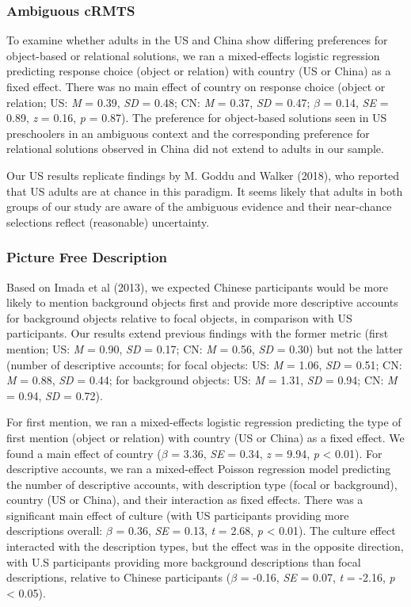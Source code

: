 \documentclass[
  man,floatsintext]{apa6}
\begin{document}
\hypertarget{ambiguous-crmts-1}{%
\subsubsection{Ambiguous cRMTS}\label{ambiguous-crmts-1}}

To examine whether adults in the US and China show differing preferences for object-based or relational solutions, we ran a mixed-effects logistic regression predicting response choice (object or relation) with country (US or China) as a fixed effect. There was no main effect of country on response choice (object or relation; US: \emph{M} = 0.39, \emph{SD} = 0.48; CN: \emph{M} = 0.37, \emph{SD} = 0.47; \(\beta\) = 0.14, \emph{SE} = 0.89, \emph{z} = 0.16, \emph{p} = 0.87). The preference for object-based solutions seen in US preschoolers in an ambiguous context and the corresponding preference for relational solutions observed in China did not extend to adults in our sample.

Our US results replicate findings by M. Goddu and Walker (2018), who reported that US adults are at chance in this paradigm. It seems likely that adults in both groups of our study are aware of the ambiguous evidence and their near-chance selections reflect (reasonable) uncertainty.

\hypertarget{picture-free-description-1}{%
\subsubsection{Picture Free Description}\label{picture-free-description-1}}

Based on Imada et al (2013), we expected Chinese participants would be more likely to mention background objects first and provide more descriptive accounts for background objects relative to focal objects, in comparison with US participants. Our results extend previous findings with the former metric (first mention; US: \emph{M} = 0.90, \emph{SD} = 0.17; CN: \emph{M} = 0.56, \emph{SD} = 0.30) but not the latter (number of descriptive accounts; for focal objects: US: \emph{M} = 1.06, \emph{SD} = 0.51; CN: \emph{M} = 0.88, \emph{SD} = 0.44; for background objects: US: \emph{M} = 1.31, \emph{SD} = 0.94; CN: \emph{M} = 0.94, \emph{SD} = 0.72).

For first mention, we ran a mixed-effects logistic regression predicting the type of first mention (object or relation) with country (US or China) as a fixed effect. We found a main effect of country (\(\beta\) = 3.36, \emph{SE} = 0.34, \emph{z} = 9.94, \emph{p} \textless{} 0.01). For descriptive accounts, we ran a mixed-effect Poisson regression model predicting the number of descriptive accounts, with description type (focal or background), country (US or China), and their interaction as fixed effects. There was a significant main effect of culture (with US participants providing more descriptions overall: \(\beta\) = 0.36, \emph{SE} = 0.13, \emph{t} = 2.68, \emph{p} \textless{} 0.01). The culture effect interacted with the description types, but the effect was in the opposite direction, with U.S participants providing more background descriptions than focal descriptions, relative to Chinese participants (\(\beta\) = -0.16, \emph{SE} = 0.07, \emph{t} = -2.16, \emph{p} \textless{} 0.05).
\end{document}

